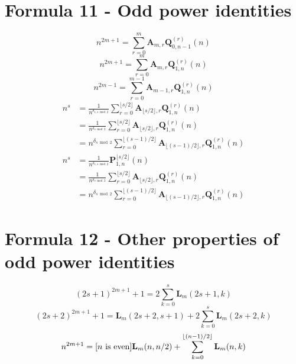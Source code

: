 \documentclass[12pt, letterpaper]{amsart}
\newcommand \iverson[1][s]{[#1 \ \mathrm{is} \ \mathrm{even}]}
\newcommand \floor [1]{\lfloor #1 \rfloor}
\theoremstyle{definition}
\theoremstyle{remark}
\numberwithin{equation}{section}
\begin{document}
\section{Formula 11 - Odd power identities}
\begin{equation*}
n^{2m+1}=\sum\limits_{r=0}^{m}\mathbf{A}_{m,r}\mathbf{Q}^{(r)}_{0,n-1}(n)
\end{equation*}
\begin{equation*}
n^{2m+1}=\sum\limits_{r=0}^{m}\mathbf{A}_{m,r}\mathbf{Q}^{(r)}_{1,n}(n)
\end{equation*}
\begin{equation*}
n^{2m-1}=\sum\limits_{r=0}^{m-1}\mathbf{A}_{m-1,r}\mathbf{Q}^{(r)}_{1,n}(n)
\end{equation*}
\begin{equation*}
\begin{split}
n^s
&= \frac{1}{n^{\delta_{1, s\bmod2}}}\sum_{r=0}^{\lfloor s/2\rfloor}\mathbf{A}_{\lfloor s/2\rfloor,r}\mathbf{Q}^{(r)}_{1,n}(n)\\
&= \frac{1}{n^{\delta_{s\bmod2}}}\sum_{r=0}^{\lfloor s/2\rfloor}\mathbf{A}_{\lfloor s/2\rfloor,r}\mathbf{Q}^{(r)}_{1,n}(n) \\
&= n^{\delta_{s\bmod2}}\sum_{r=0}^{\lfloor (s-1)/2\rfloor}\mathbf{A}_{\lfloor (s-1)/2\rfloor,r}\mathbf{Q}^{(r)}_{1,n}(n)
\end{split}
\end{equation*}
\begin{equation*}
\begin{split}
n^s
&= \frac{1}{n^{\delta_{1, s\bmod2}}}\mathbf{P}^{\lfloor s/2\rfloor}_{1,n}(n)\\
&= \frac{1}{n^{\delta_{s\bmod2}}}\sum_{r=0}^{\lfloor s/2\rfloor}\mathbf{A}_{\lfloor s/2\rfloor,r}\mathbf{Q}^{(r)}_{1,n}(n) \\
&= n^{\delta_{s\bmod2}}\sum_{r=0}^{\lfloor (s-1)/2\rfloor}\mathbf{A}_{\lfloor (s-1)/2\rfloor,r}\mathbf{Q}^{(r)}_{1,n}(n)
\end{split}
\end{equation*}
\section{Formula 12 - Other properties of odd power identities}
\begin{equation*}
(2s+1)^{2m+1}+1=2\sum_{k=0}^{s} \mathbf{L}_m(2s+1,k)
\end{equation*}
\begin{equation*}
(2s+2)^{2m+1}+1=\mathbf{L}_m(2s+2,s+1)+2\sum_{k=0}^{s} \mathbf{L}_m(2s+2,k)
\end{equation*}
\begin{equation*}
n^{2m+1} = \iverson[n] \polynomL(n, n/2) + \sum_{k=0}^{\floor{(n-1)/2}} \polynomL
\end{equation*}
\end{document}
